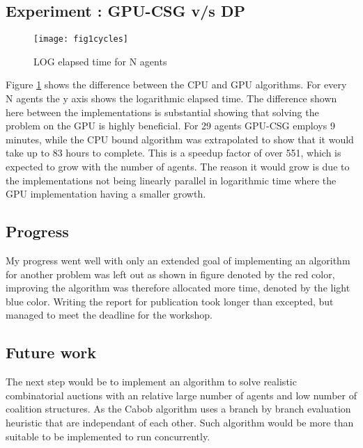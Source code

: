 \documentclass[a4paper, 12pt]{report}
\begin{document}
\subsection{Experiment : GPU-CSG v/s DP}
\begin{figure}[htbp]\centering
\texttt{[image: fig1cycles]}
\caption{LOG elapsed time for N agents\label{time}}
\end{figure}
Figure \ref{time} shows the difference between the CPU and GPU algorithms.
For every N agents the y axis shows the logarithmic elapsed time. The difference
shown here between the implementations is substantial showing
that solving the problem on the GPU is highly beneficial. For 29 agents GPU-CSG
employs 9 minutes, while the CPU bound algorithm was extrapolated to show that
it would take up to 83 hours to complete. This is a speedup factor of over 551,
which is expected to grow with the number of agents. The reason it would grow is
due to the implementations not being linearly parallel in logarithmic time where
the GPU implementation having a smaller growth.

\subsection{Progress}

My progress went well with only an extended goal of implementing an algorithm for another problem was left out as shown in figure \label{actual} denoted by the red color,
improving the algorithm was therefore allocated more time, denoted by the light blue color.
Writing the report for publication took longer than excepted, but managed to meet the deadline for the workshop.


\subsection{Future work}
The next step would be to implement an algorithm to solve
realistic combinatorial auctions with an relative large number of agents and low
number of coalition structures.
As the Cabob algorithm uses a branch by branch evaluation heuristic that are
independant of each other.
Such algorithm would be more than suitable to be implemented to run
concurrently. \\
\end{document}
